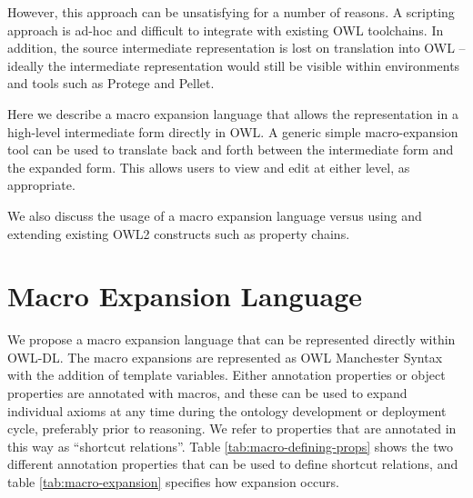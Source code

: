 \documentclass{llncs}
\begin{document}
However, this approach can be unsatisfying for a number of reasons. A
scripting approach is ad-hoc and difficult to integrate with existing
OWL toolchains. In addition, the source intermediate representation is
lost on translation into OWL -- ideally the intermediate representation
would still be visible within environments and tools such as
Protege and Pellet.



Here we describe a macro expansion language that allows the
representation in a high-level intermediate form directly in OWL. A
generic simple macro-expansion tool can be used to translate back and
forth between the intermediate form and the expanded form. This allows
users to view and edit at either level, as appropriate.


We also discuss the usage of a macro expansion language versus using
and extending existing OWL2 constructs such as property chains.

\section{Macro Expansion Language}

We propose a macro expansion language that can be represented directly
within OWL-DL. The macro expansions are represented as OWL Manchester
Syntax\cite{Horridge2006} with the addition of template
variables. Either annotation properties or object properties are
annotated with macros, and these can be used to expand individual
axioms at any time during the ontology development or deployment
cycle, preferably prior to reasoning. We refer to properties that are
annotated in this way as ``shortcut relations''.  Table
\ref{tab:macro-defining-props} shows the two different annotation
properties that can be used to define shortcut relations, and table
\ref{tab:macro-expansion} specifies how expansion occurs.
\end{document}
